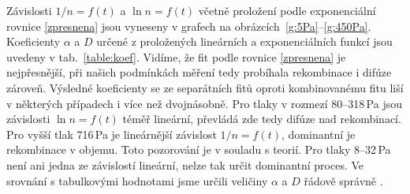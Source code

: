 \documentclass[a4paper,12pt]{article}
\begin{document}
Závislosti $1/n = f(t)$ a $\ln n = f(t)$ včetně proložení podle exponenciální 
rovnice 
\eqref{zpresnena} jsou vyneseny v grafech na obrázcích~\ref{g:5Pa}--\ref{g:450Pa}. 
Koeficienty $\alpha$ a $D$ určené z proložených lineárních a exponenciálních funkcí jsou 
uvedeny v tab.~\ref{table:koef}. Vidíme, že fit podle rovnice 
\ref{zpresnena} je nejpřesnější, při našich podmínkách měření tedy probíhala 
rekombinace i difúze zároveň. Výsledné koeficienty se ze separátních fitů oproti 
kombinovanému fitu liší v některých případech i více než dvojnásobně. Pro 
tlaky v rozmezí 80--318\,Pa jsou závislosti $\ln n = f(t)$ téměř lineární, 
převládá zde tedy difúze nad rekombinací. Pro vyšší tlak 716\,Pa je lineárnější 
závislost $1/n = f(t)$, dominantní je rekombinace v objemu. Toto pozorování je 
v souladu s teorií. Pro tlaky 8--32\,Pa není ani jedna ze závislostí lineární, 
nelze tak určit dominantní proces. Ve srovnání s tabulkovými hodnotami jsme 
určili veličiny $\alpha$ a $D$ řádově správně \cite{alpha,D}.
\end{document}
